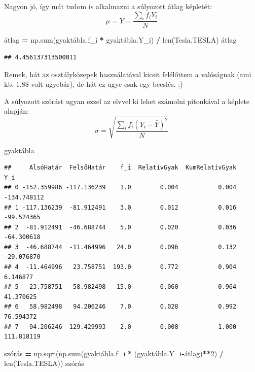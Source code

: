 \documentclass[
]{book}
\newenvironment{Shaded}{\begin{snugshade}}{\end{snugshade}}
\newcommand{\BuiltInTok}[1]{#1}
\newcommand{\DecValTok}[1]{\textcolor[rgb]{0.00,0.00,0.81}{#1}}
\newcommand{\NormalTok}[1]{#1}
\newcommand{\OperatorTok}[1]{\textcolor[rgb]{0.81,0.36,0.00}{\textbf{#1}}}
\begin{document}
Nagyon jó, így mát tudom is alkalmazni a súlyozott átlag képletét: \[\mu=\bar{Y}=\frac{\sum_i{f_iY_i}}{N}\]

\begin{Shaded}
\begin{Highlighting}[]
\NormalTok{átlag }\OperatorTok{=}\NormalTok{ np.}\BuiltInTok{sum}\NormalTok{(gyaktábla.f\_i }\OperatorTok{*}\NormalTok{ gyaktábla.Y\_i) }\OperatorTok{/} \BuiltInTok{len}\NormalTok{(Tesla.TESLA)}
\NormalTok{átlag}
\end{Highlighting}
\end{Shaded}

\begin{verbatim}
## 4.456137313500011
\end{verbatim}

Remek, hát az osztályközepek használatával kicsit felélőttem a valóságnak (ami kb. \(1.8\$\) volt ugyebár), de hát ez ugye csak egy becslés. :)

A súlyozott szórást ugyan ezzel az elvvel ki lehet számolni pitonkával a képlete alapján: \[\sigma=\sqrt{\frac{\sum_i{f_i(Y_i-\bar{Y})^2}}{N}}\]

\begin{Shaded}
\begin{Highlighting}[]
\NormalTok{gyaktábla}
\end{Highlighting}
\end{Shaded}

\begin{verbatim}
##     AlsóHatár  FelsőHatár    f_i  RelatívGyak  KumRelatívGyak         Y_i
## 0 -152.359986 -117.136239    1.0        0.004           0.004 -134.748112
## 1 -117.136239  -81.912491    3.0        0.012           0.016  -99.524365
## 2  -81.912491  -46.688744    5.0        0.020           0.036  -64.300618
## 3  -46.688744  -11.464996   24.0        0.096           0.132  -29.076870
## 4  -11.464996   23.758751  193.0        0.772           0.904    6.146877
## 5   23.758751   58.982498   15.0        0.060           0.964   41.370625
## 6   58.982498   94.206246    7.0        0.028           0.992   76.594372
## 7   94.206246  129.429993    2.0        0.008           1.000  111.818119
\end{verbatim}

\begin{Shaded}
\begin{Highlighting}[]
\NormalTok{szórás }\OperatorTok{=}\NormalTok{ np.sqrt(np.}\BuiltInTok{sum}\NormalTok{(gyaktábla.f\_i }\OperatorTok{*}\NormalTok{ (gyaktábla.Y\_i}\OperatorTok{{-}}\NormalTok{átlag)}\OperatorTok{**}\DecValTok{2}\NormalTok{) }\OperatorTok{/} \BuiltInTok{len}\NormalTok{(Tesla.TESLA))}
\NormalTok{szórás}
\end{Highlighting}
\end{Shaded}
\end{document}

